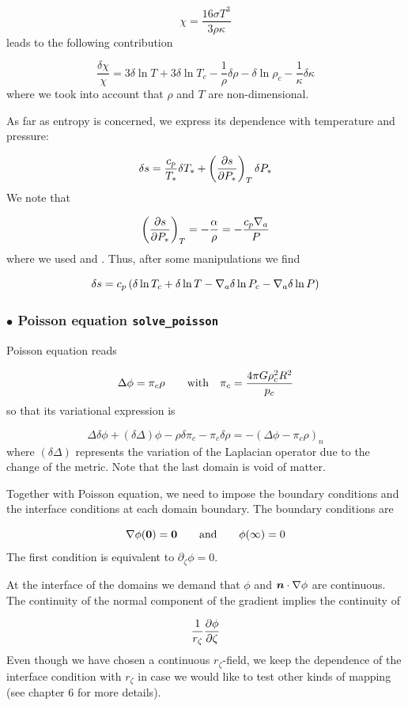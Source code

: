 \[ \chi = \frac{16\sigma T^3}{3\rho\kappa}\]
leads to the following contribution

\[ \frac{\delta \chi}{\chi} = 3\delta\ln T+3\delta\ln T_c
-\frac{1}{\rho}\delta\rho - \delta\ln\rho_c - \frac{1}{\kappa}\delta\kappa\]
where we took into account that $\rho$ and $T$ are non-dimensional.

As far as entropy is concerned, we express its dependence with temperature and
pressure:

\[ \delta s = \frac{c_p}{T_*}\delta T_* + \left(\frac{\partial s}{\partial
P_*}\right)_T\delta P_*\]
We note that

\[ \left(\frac{\partial s}{\partial
P_*}\right)_T = -\frac{\alpha}{\rho} = -\frac{c_p\nabla_a}{P}\]
where we used  and .
Thus, after some manipulations we find

\[ \delta s = c_p\left(\delta\ln T_c + \delta\ln T - \nabla_a\delta\ln P_c
-\nabla_a\delta\ln P \right)\]

\subsubsection{$\bullet$ \bf Poisson equation {\tt solve\_poisson}}

Poisson equation reads

\[ \Delta \phi = \pi_c \rho \qquad {\rm with}\quad  \pi_c = \frac{4 \pi G
\rho_c^2 R^2}{p_c}\]
so that its variational expression is 

\[ \Delta \delta\phi +(\delta\Delta)\phi - \rho\delta\pi_c  -
\pi_c\delta\rho = -(\Delta \phi - \pi_c \rho)_n \]
where $(\delta\Delta)$ represents the variation of the Laplacian operator due
to the change of the metric. Note that the last domain is void of matter.

Together with Poisson equation, we need to impose the boundary conditions and
the interface conditions at each domain boundary. The boundary conditions are

\[ \na\phi(\vzero) = \vzero  \andet \phi(\infty) = 0\]
The first condition is equivalent to $\partial_\zeta\phi=0$.

At the interface of the domains we demand that $\phi$ and $\vn\cdot\na\phi$
are continuous. The continuity of the normal component of the gradient implies
the continuity of

\[ \frac{1}{r_\zeta}\frac{\partial \phi}{\partial \zeta}\]
Even though we have chosen a continuous $r_\zeta$-field, we keep the
dependence of the interface condition with $r_\zeta$ in case we would like to
test other kinds of mapping (see chapter 6 for more details).


